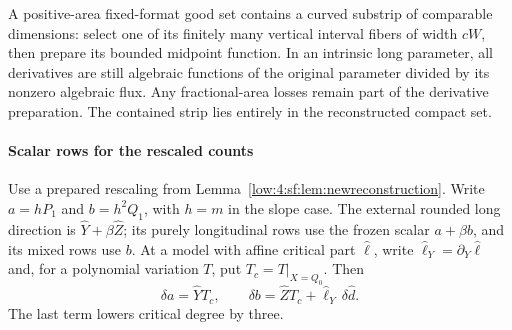 \documentclass[11pt]{amsart}
\theoremstyle{definition}
\theoremstyle{remark}
\numberwithin{equation}{section}
\begin{document}
A positive-area fixed-format good set contains a curved substrip of comparable dimensions: select one of its finitely many vertical interval fibers of width $cW$, then prepare its bounded midpoint function. In an intrinsic long parameter, all derivatives are still algebraic functions of the original parameter divided by its nonzero algebraic flux. Any fractional-area losses remain part of the derivative preparation. The contained strip lies entirely in the reconstructed compact set.

\paragraph{Scalar rows for the rescaled counts}

Use a prepared rescaling from Lemma~\ref{low:4:sf:lem:newreconstruction}. Write $a=hP_1$ and $b=h^2Q_1$, with $h=m$ in the slope case. The external rounded long direction is $\widehat Y+\beta\widehat Z$; its purely longitudinal rows use the frozen scalar $a+\beta b$, and its mixed rows use $b$. At a model with affine critical part $\widehat\ell$, write $\widehat\ell_Y=\partial_Y\widehat\ell$ and, for a polynomial variation $T$, put $T_c=T|_{X=Q_0}$. Then
\[
  \delta a=\widehat YT_c,\qquad
  \delta b=\widehat ZT_c+\widehat\ell_Y\,\delta\widehat d.
\]
The last term lowers critical degree by three.
\end{document}
